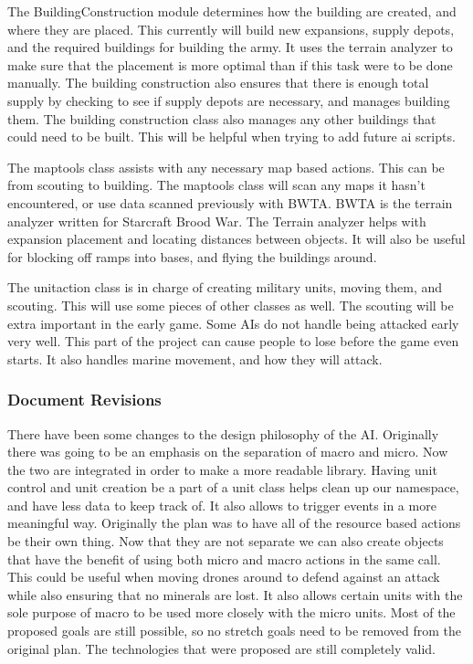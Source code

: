 \documentclass[10pt,letterpaper,onecolumn,draftclsnofoot]{IEEEtran}
\begin{document}
	The BuildingConstruction module determines how the building are created, and where they are placed. This currently will build new expansions, supply depots, and the required buildings for building the army. It uses the terrain analyzer to make sure that the placement is more optimal than if this task were to be done manually. The building construction also ensures that there is enough total supply by checking to see if supply depots are necessary, and manages building them. The building construction class also manages any other buildings that could need to be built. This will be helpful when trying to add future ai scripts. 
	
	The maptools class assists with any necessary map based actions. This can be from scouting to building. The maptools class will scan any maps it hasn't encountered, or use data scanned previously with BWTA. BWTA is the terrain analyzer written for Starcraft Brood War. The Terrain analyzer helps with expansion placement and locating distances between objects. It will also be useful for blocking off ramps into bases, and flying the buildings around. 
	
	The unitaction class is in charge of creating military units, moving them, and scouting. This will use some pieces of other classes as well. The scouting will be extra important in the early game. Some AIs do not handle being attacked early very well. This part of the project can cause people to lose before the game even starts. It also handles marine movement, and how they will attack. 
	
	\subsubsection{Document Revisions}
	There have been some changes to the design philosophy of the AI. Originally there was going to be an emphasis on the separation of macro and micro. Now the two are integrated in order to make a more readable library. Having unit control and unit creation be a part of a unit class helps clean up our namespace, and have less data to keep track of. It also allows to trigger events in a more meaningful way. Originally the plan was to have all of the resource based actions be their own thing. Now that they are not separate we can also create objects that have the benefit of using both micro and macro actions in the same call. This could be useful when moving drones around to defend against an attack while also ensuring that no minerals are lost. It also allows certain units with the sole purpose of macro to be used more closely with the micro units. Most of the proposed goals are still possible, so no stretch goals need to be removed from the original plan. The technologies that were proposed are still completely valid.
\end{document}
